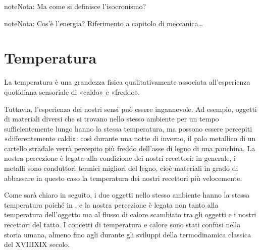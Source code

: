 \documentclass[letterpaper,10pt,italian]{jupyterBook}
\begin{document}
\begin{sphinxadmonition}{note}{Nota:}
\sphinxAtStartPar
Ma come si definisce l’isocronismo?
\end{sphinxadmonition}

\begin{sphinxadmonition}{note}{Nota:}
\sphinxAtStartPar
Cos’è l’energia? Riferimento a capitolo di meccanica…
\end{sphinxadmonition}



\sphinxstepscope


\section{Temperatura}
\label{\detokenize{ch/intro/physical_quantities-temperature:temperatura}}\label{\detokenize{ch/intro/physical_quantities-temperature:physics-hs-intro-physical-quantities-temperature}}\label{\detokenize{ch/intro/physical_quantities-temperature::doc}}
\sphinxAtStartPar
La temperatura è una grandezza fisica qualitativamente associata all’esperienza quotidiana sensoriale di «caldo» e «freddo».

\sphinxAtStartPar
Tuttavia, l’esperienza dei nostri sensi può essere ingannevole. Ad esempio, oggetti di materiali diversi che si trovano nello stesso ambiente \sphinxhyphen{} per un tempo sufficientemente lungo \sphinxhyphen{} hanno la stessa temperatura, ma possono essere percepiti «differentemente caldi»: così durante una notte di inverno, il palo metallico di un cartello stradale verrà percepito più freddo dell’asse di legno di una panchina. La nostra percezione è legata alla condizione dei nostri recettori: in generale, i metalli sono conduttori termici migliori del legno, cioè materiali in grado di abbassare \sphinxhyphen{} in questo caso \sphinxhyphen{} la temperatura dei nostri recettori più velocemente.

\sphinxAtStartPar
Come sarà chiaro in seguito, i due oggetti nello stesso ambiente hanno la stessa temperatura poiché in {\hyperref[\detokenize{ch/thermodynamics/foundation-experiments:physics-hs-thermodynamics-foundation-experiments-th-equilibrium}]{}}, e la nostra percezione è legata non tanto alla temperatura dell’oggetto ma al flusso di calore scambiato tra gli oggetti e i nostri recettori del tatto. I concetti di temperatura e calore sono stati confusi nella storia umana, almeno fino agli {\hyperref[\detokenize{ch/thermodynamics/foundation-experiments:physics-hs-thermodynamics-foundation-experiments-calorimetry}]{}} durante gli sviluppi della termodinamica classica del XVIII\sphinxhyphen{}XIX secolo.
\end{document}
